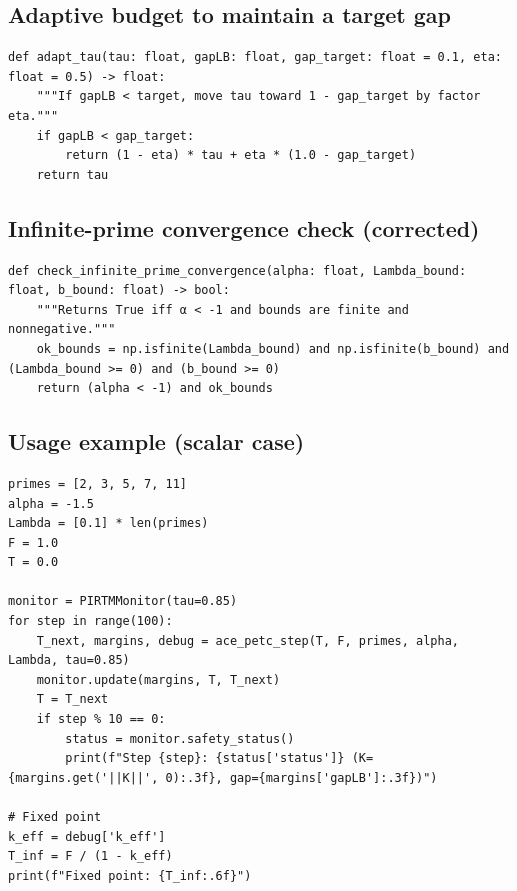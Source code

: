 \documentclass[11pt]{article}
\theoremstyle{plain}
\theoremstyle{definition}
\theoremstyle{remark}
\begin{document}
\subsection{Adaptive budget to maintain a target gap}
\begin{lstlisting}[style=py,caption={Simple adaptive policy for τ to keep a safety gap}]
def adapt_tau(tau: float, gapLB: float, gap_target: float = 0.1, eta: float = 0.5) -> float:
    """If gapLB < target, move tau toward 1 - gap_target by factor eta."""
    if gapLB < gap_target:
        return (1 - eta) * tau + eta * (1.0 - gap_target)
    return tau
\end{lstlisting}

\subsection{Infinite-prime convergence check (corrected)}
\begin{lstlisting}[style=py,caption={Absolute convergence test for ∑ b_p|Λ_p|p^α}]
def check_infinite_prime_convergence(alpha: float, Lambda_bound: float, b_bound: float) -> bool:
    """Returns True iff α < -1 and bounds are finite and nonnegative."""
    ok_bounds = np.isfinite(Lambda_bound) and np.isfinite(b_bound) and (Lambda_bound >= 0) and (b_bound >= 0)
    return (alpha < -1) and ok_bounds
\end{lstlisting}

\subsection{Usage example (scalar case)}
\begin{lstlisting}[style=py,caption={Scalar PIRTM loop with monitoring and fixed-point estimate}]
primes = [2, 3, 5, 7, 11]
alpha = -1.5
Lambda = [0.1] * len(primes)
F = 1.0
T = 0.0

monitor = PIRTMMonitor(tau=0.85)
for step in range(100):
    T_next, margins, debug = ace_petc_step(T, F, primes, alpha, Lambda, tau=0.85)
    monitor.update(margins, T, T_next)
    T = T_next
    if step % 10 == 0:
        status = monitor.safety_status()
        print(f"Step {step}: {status['status']} (K={margins.get('||K||', 0):.3f}, gap={margins['gapLB']:.3f})")

# Fixed point
k_eff = debug['k_eff']
T_inf = F / (1 - k_eff)
print(f"Fixed point: {T_inf:.6f}")
\end{lstlisting}
\end{document}
